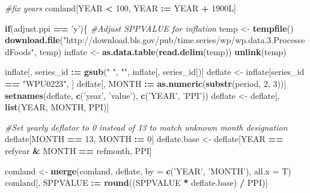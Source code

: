 \documentclass[]{article}
\newenvironment{Shaded}{\begin{snugshade}}{\end{snugshade}}
\newcommand{\KeywordTok}[1]{\textcolor[rgb]{0.13,0.29,0.53}{\textbf{#1}}}
\newcommand{\DataTypeTok}[1]{\textcolor[rgb]{0.13,0.29,0.53}{#1}}
\newcommand{\DecValTok}[1]{\textcolor[rgb]{0.00,0.00,0.81}{#1}}
\newcommand{\StringTok}[1]{\textcolor[rgb]{0.31,0.60,0.02}{#1}}
\newcommand{\CommentTok}[1]{\textcolor[rgb]{0.56,0.35,0.01}{\textit{#1}}}
\newcommand{\ControlFlowTok}[1]{\textcolor[rgb]{0.13,0.29,0.53}{\textbf{#1}}}
\newcommand{\OperatorTok}[1]{\textcolor[rgb]{0.81,0.36,0.00}{\textbf{#1}}}
\newcommand{\ErrorTok}[1]{\textcolor[rgb]{0.64,0.00,0.00}{\textbf{#1}}}
\newcommand{\NormalTok}[1]{#1}
\begin{document}
\begin{Shaded}
\begin{Highlighting}[]
{\CommentTok{#fix years}
\NormalTok{comland[YEAR }\OperatorTok{<}\StringTok{ }\DecValTok{100}\NormalTok{, YEAR }\OperatorTok{:}\ErrorTok{=}\StringTok{ }\NormalTok{YEAR }\OperatorTok{+}\StringTok{ }\NormalTok{1900L]}

\ControlFlowTok{if}\NormalTok{(adjust.ppi }\OperatorTok{==}\StringTok{ 'y'}\NormalTok{)\{}
    \CommentTok{#Adjust SPPVALUE for inflation}
\NormalTok{    temp <-}\StringTok{ }\KeywordTok{tempfile}\NormalTok{()}
    \KeywordTok{download.file}\NormalTok{(}\StringTok{"http://download.bls.gov/pub/time.series/wp/wp.data.3.ProcessedFoods"}\NormalTok{, temp)}
\NormalTok{    inflate <-}\StringTok{ }\KeywordTok{as.data.table}\NormalTok{(}\KeywordTok{read.delim}\NormalTok{(temp))}
    \KeywordTok{unlink}\NormalTok{(temp)}
    
\NormalTok{    inflate[, series_id }\OperatorTok{:}\ErrorTok{=}\StringTok{ }\KeywordTok{gsub}\NormalTok{(}\StringTok{" "}\NormalTok{, }\StringTok{""}\NormalTok{, inflate[, series_id])]}
\NormalTok{    deflate <-}\StringTok{ }\NormalTok{inflate[series_id }\OperatorTok{==}\StringTok{ "WPU0223"}\NormalTok{, ]}
\NormalTok{    deflate[, MONTH }\OperatorTok{:}\ErrorTok{=}\StringTok{ }\KeywordTok{as.numeric}\NormalTok{(}\KeywordTok{substr}\NormalTok{(period, }\DecValTok{2}\NormalTok{, }\DecValTok{3}\NormalTok{))]}
    \KeywordTok{setnames}\NormalTok{(deflate, }\KeywordTok{c}\NormalTok{(}\StringTok{'year'}\NormalTok{, }\StringTok{'value'}\NormalTok{), }\KeywordTok{c}\NormalTok{(}\StringTok{'YEAR'}\NormalTok{, }\StringTok{'PPI'}\NormalTok{))}
\NormalTok{    deflate <-}\StringTok{ }\NormalTok{deflate[, }\KeywordTok{list}\NormalTok{(YEAR, MONTH, PPI)]}
    
    \CommentTok{#Set yearly deflator to 0 instead of 13 to match unknown month designation}
\NormalTok{    deflate[MONTH }\OperatorTok{==}\StringTok{ }\DecValTok{13}\NormalTok{, MONTH }\OperatorTok{:}\ErrorTok{=}\StringTok{ }\DecValTok{0}\NormalTok{]}
\NormalTok{    deflate.base <-}\StringTok{ }\NormalTok{deflate[YEAR }\OperatorTok{==}\StringTok{ }\NormalTok{refyear }\OperatorTok{&}\StringTok{ }\NormalTok{MONTH }\OperatorTok{==}\StringTok{ }\NormalTok{refmonth, PPI]}
    
\NormalTok{    comland <-}\StringTok{ }\KeywordTok{merge}\NormalTok{(comland, deflate, }\DataTypeTok{by =} \KeywordTok{c}\NormalTok{(}\StringTok{'YEAR'}\NormalTok{, }\StringTok{'MONTH'}\NormalTok{), }\DataTypeTok{all.x =}\NormalTok{ T)}
\NormalTok{    comland[, SPPVALUE }\OperatorTok{:}\ErrorTok{=}\StringTok{ }\KeywordTok{round}\NormalTok{((SPPVALUE }\OperatorTok{*}\StringTok{ }\NormalTok{deflate.base) }\OperatorTok{/}\StringTok{ }\NormalTok{PPI)]}
    
}
\end{Highlighting}
\end{Shaded}
\end{document}
